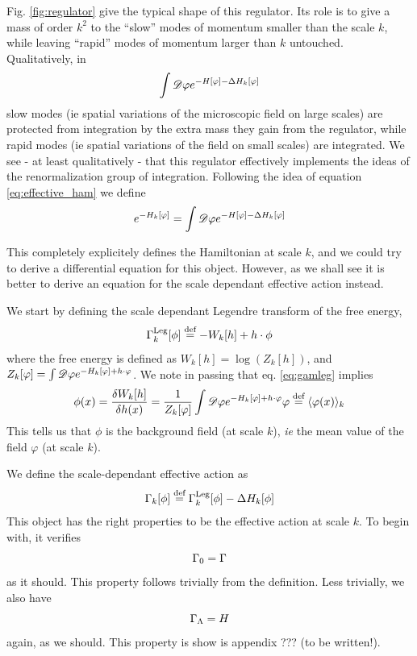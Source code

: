 Fig. \ref{fig:regulator} give the typical shape of this regulator. Its role is to give a mass of order $k^2$ to the ``slow'' modes of momentum smaller than the scale $k$, while leaving ``rapid'' modes of momentum larger than $k$ untouched. Qualitatively, in  
\begin{equation}
\int  \mathscr{D}  \varphi e^{-H[\varphi] - \Delta H_k[\varphi]}
\end{equation}
slow modes (ie spatial variations of the microscopic field on large scales) are protected from integration by the extra mass they gain from the regulator, while rapid modes (ie spatial variations of the field on small scales) are integrated. We see - at least qualitatively - that this regulator effectively implements the ideas of the renormalization group of integration. Following the idea of equation \ref{eq:effective_ham} we define
\begin{equation}
e^{-H_k[\varphi]} = \int  \mathscr{D}  \varphi e^{-H[\varphi] - \Delta H_k[\varphi]}
\end{equation}

This completely explicitely defines the Hamiltonian at scale $k$, and we could try to derive a differential equation for this object. However, as we shall see it is better to derive an equation for the scale dependant effective action instead.

We start by defining the scale dependant Legendre transform of the free energy,
\begin{equation}
\label{eq:gamleg}
\Gamma_k^{\text{Leg}}[\phi]  \overset{\text{def}}{=}  - W_k[h] + h \cdot \phi
\end{equation}
where the free energy is defined as $W_k[h] = \log(Z_k[h])$, and $Z_k[\varphi] = \int  \mathscr{D}  \varphi e^{-H_k[\varphi] + h \cdot \varphi}$.
We note in passing that eq. \ref{eq:gamleg} implies 
\begin{equation}
\phi(x) = \frac{\delta W_k[h]}{\delta h(x)} = \frac{1}{Z_k[\varphi]} \int  \mathscr{D}  \varphi e^{-H_k[\varphi] + h \cdot \varphi} \varphi  \overset{\text{def}}{=}  \langle \varphi(x) \rangle_k
\end{equation}
This tells us that $\phi$ is the background field (at scale $k$), \textit{ie} the mean value of the field $\varphi$ (at scale $k$). 

We define the scale-dependant effective action as
\begin{equation}
\Gamma_k[\phi]  \overset{\text{def}}{=}  \Gamma_k^{\text{Leg}}[\phi] - \Delta H_k[\phi]
\end{equation}
This object has the right properties to be the effective action at scale $k$. To begin with, it verifies
\begin{equation}
\Gamma_0 = \Gamma
\end{equation}
as it should. This property follows trivially from the definition. Less trivially, we also have
\begin{equation}
\Gamma_\Lambda = H
\end{equation}
again, as we should. This property is show is appendix ??? (to be written!).


